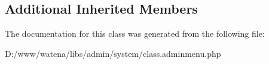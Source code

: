 \subsection*{Additional Inherited Members}


The documentation for this class was generated from the following file\-:\begin{DoxyCompactItemize}
\item 
D\-:/www/watena/libs/admin/system/class.\-adminmenu.\-php\end{DoxyCompactItemize}
